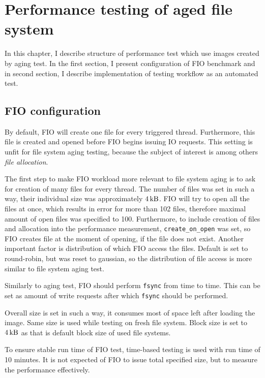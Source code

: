 \documentclass[
  color, %
  table, %
  lof,   %
  lot,   %
]{fithesis3}
\begin{document}
\chapter{Performance testing of aged file system}
\label{fio}
In this chapter, I describe structure of performance test which use images created by aging test. In the first section, I present configuration of FIO benchmark and in second section, I describe implementation of testing workflow as an automated test.

\section{FIO configuration} 


By default, FIO will create one file for every triggered thread. Furthermore, this file is created and opened before FIO begins issuing IO requests. This setting is unfit for file system aging testing, because the subject of interest is among others \emph{file allocation}.

The first step to make FIO workload more relevant to file system aging is to ask for creation of many files for every thread. The number of files was set in such a way, their individual size was approximately $\SI{4}{\kilo\byte}$. FIO will try to open all the files at once, which results in error for more than 102 files, therefore maximal amount of open files was specified to 100. Furthermore, to include creation of files and allocation into the performance measurement, \texttt{create\_on\_open} was set, so FIO creates file at the moment of opening, if the file does not exist. Another important factor is distribution of which FIO access the files. Default is set to round-robin, but was reset to gaussian, so the distribution of file access is more similar to file system aging test.

Similarly to aging test, FIO should perform \texttt{fsync} from time to time. This can be set as amount of write requests after which \texttt{fsync} should be performed.

Overall size is set in such a way, it consumes most of space left after loading the image. Same size is used while testing on fresh file system. Block size is set to $\SI{4}{\kilo\byte}$ as that is default block size of used file systems.

To ensure stable run time of FIO test, time-based testing is used with run time of 10 minutes. It is not expected of FIO to issue total specified size, but to measure the performance effectively.
\end{document}
